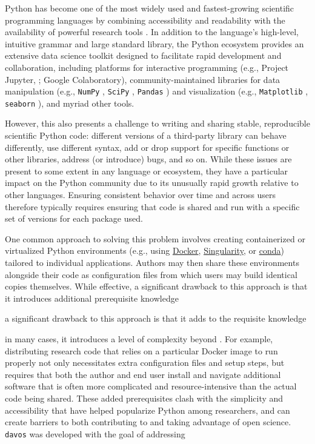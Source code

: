 \documentclass[preprint,12pt, a4paper]{elsarticle}
\begin{document}
Python has become one of the most widely used and fastest-growing scientific programming languages by combining accessibility and readability with the availability of powerful research tools \cite{MullEtal15}. In addition to the language’s high-level, intuitive grammar and large standard library, the Python ecosystem provides an extensive data science toolkit designed to facilitate rapid development and collaboration, including platforms for interactive programming (e.g., Project Jupyter, \cite{KluyEtal16}; Google Colaboratory), community-maintained libraries for data manipulation (e.g., \texttt{NumPy} \cite{HarrEtal20}, \texttt{SciPy} \cite{VirtEtal20}, \texttt{Pandas} \cite{McKi10}) and visualization (e.g., \texttt{Matplotlib} \cite{Hunt07}, \texttt{seaborn} \cite{Wask21}), and myriad other tools.

However, this also presents a challenge to writing and sharing stable, reproducible scientific Python code: different versions of a third-party library can behave differently, use different syntax, add or drop support for specific functions or other libraries, address (or introduce) bugs, and so on. While these issues are present to some extent in any language or ecosystem, they have a particular impact on the Python community due to its unusually rapid growth relative to other languages. Ensuring consistent behavior over time and across users therefore typically requires ensuring that code is shared and run with a specific set of versions for each package used. 

One common approach to solving this problem involves creating containerized or virtualized Python environments (e.g., using \href{https://www.docker.com/}{Docker}, \href{https://sylabs.io/singularity/}{Singularity}, or \href{https://docs.conda.io/en/latest/}{conda}) tailored to individual applications. Authors may then share these environments alongside their code as configuration files from which users may build identical copies themselves. While effective, a significant drawback to this approach is that it introduces additional prerequisite knowledge  




a significant drawback to this approach is that it adds to the requisite knowledge 




in many cases, it introduces a level of complexity beyond . For example, distributing research code that relies on a particular Docker image to run properly not only necessitates extra configuration files and setup steps, but requires that both the author and end user install and navigate additional software that is often more complicated and resource-intensive than the actual code being shared. These added prerequisites clash with the simplicity and accessibility that have helped popularize Python among researchers, and can create barriers to both contributing to and taking advantage of open science. \texttt{davos} was developed with the goal of addressing 
\end{document}
